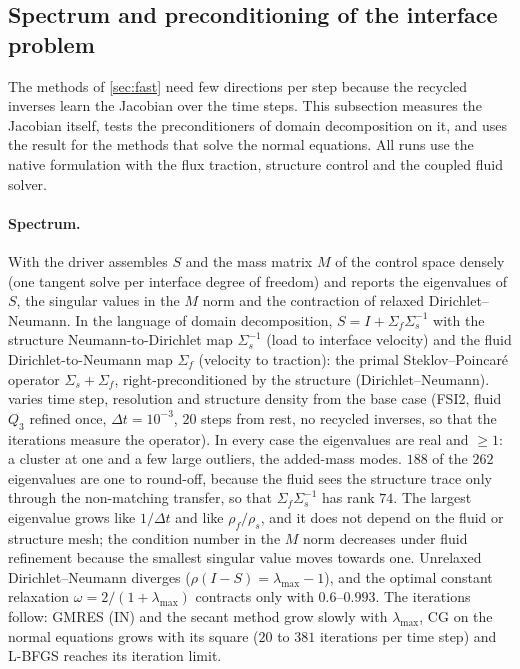 \documentclass[11pt,a4paper]{article}
\theoremstyle{definition}
\theoremstyle{remark}
\newcommand{\M}{M}
\begin{document}
\subsection{Spectrum and preconditioning of the interface problem}\label{sec:preconditioning}

The methods of \cref{sec:fast} need few directions per step because the recycled inverses learn
the Jacobian over the time steps. This subsection measures the Jacobian itself, tests the
preconditioners of domain decomposition on it, and uses the result for the methods that solve the
normal equations. All runs use the native formulation with the flux traction, structure control
and the coupled fluid solver.

\paragraph{Spectrum.} With  the driver assembles $S$ and the
mass matrix $\M$ of the control space densely (one tangent solve per interface degree of freedom)
and reports the eigenvalues of $S$, the singular values in the $\M$ norm and the contraction of
relaxed Dirichlet--Neumann. In the language of domain decomposition,
$S=I+\Sigma_f\Sigma_s^{-1}$ with the structure Neumann-to-Dirichlet map $\Sigma_s^{-1}$ (load to
interface velocity) and the fluid Dirichlet-to-Neumann map $\Sigma_f$ (velocity to traction): the
primal Steklov--Poincar\'e operator $\Sigma_s+\Sigma_f$, right-preconditioned by the structure
(Dirichlet--Neumann).  varies time step, resolution and structure density from
the base case (FSI2, fluid $Q_3$ refined once, $\Delta t=10^{-3}$, $20$ steps from rest, no recycled
inverses, so that the iterations measure the operator). In every case the eigenvalues are real and
$\ge1$: a cluster at one and a few large outliers, the added-mass modes. $188$ of the $262$
eigenvalues are one to round-off, because the fluid sees the structure trace only through the
non-matching transfer, so that $\Sigma_f\Sigma_s^{-1}$ has rank $74$. The largest eigenvalue grows
like $1/\Delta t$ and like $\rho_f/\rho_s$, and it does not depend on the fluid or structure mesh;
the condition number in the $\M$ norm decreases under fluid refinement because the smallest
singular value moves towards one. Unrelaxed Dirichlet--Neumann diverges ($\rho(I-S)=\lambda_{\max}-1$),
and the optimal constant relaxation $\omega=2/(1+\lambda_{\max})$ contracts only with
$0.6$--$0.993$. The iterations follow: GMRES (IN) and the secant method grow slowly with
$\lambda_{\max}$, CG on the normal equations grows with its square ($20$ to $381$ iterations per
time step) and L-BFGS reaches its iteration limit.
\end{document}
